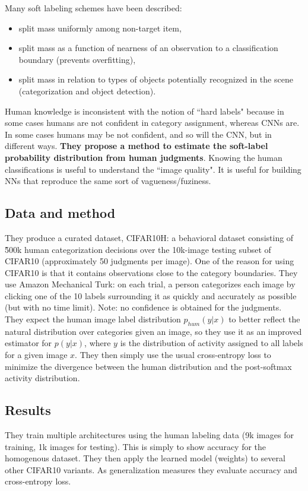 Many soft labeling schemes have been described:
\begin{itemize}
    \item split mass uniformly among non-target item,
    \item split mass as a function of nearness of an observation to a classification boundary (prevents overfitting),
    \item split mass in relation to types of objects potentially recognized in the scene (categorization and object detection).
\end{itemize}

Human knowledge is inconsistent with the notion of ``hard labels" because in some cases humans are not confident in category assignment, whereas CNNs are. In some cases humans may be not confident, and so will the CNN, but in different ways. \textbf{They propose a method to estimate the soft-label probability distribution from human judgments}. Knowing the human classifications is useful to understand the ``image quality". It is useful for building NNs that reproduce the same sort of vagueness/fuziness.

\subsection{Data and method}
They produce a curated dataset, CIFAR10H: a behavioral dataset consisting of \~500k human categorization decisions over the 10k-image testing subset of CIFAR10 (approximately 50 judgments per image). One of the reason for using  CIFAR10 is that it contains observations close to the category boundaries. They use Amazon Mechanical Turk: on each trial, a person categorizes each image by clicking one of the 10 labels surrounding it as quickly and accurately as possible (but with no time limit). Note: no confidence is obtained for the judgments.\\  

They expect the human image label distribution $p_{hum}(y|x)$ to better reflect the natural distribution over categories given an image, so they use it as an improved estimator for $p(y|x)$, where $y$ is the distribution of activity assigned to all labels for a given image $x$. They then simply use the usual cross-entropy loss to minimize the divergence between the human distribution and the post-softmax activity distribution.

\subsection{Results}
They train multiple architectures using the human labeling data (9k images for training, 1k images for testing). This is simply to show accuracy for the homogenous dataset.
They then apply the learned model (weights) to several other CIFAR10 variants. As generalization measures they evaluate accuracy and cross-entropy loss.\\

